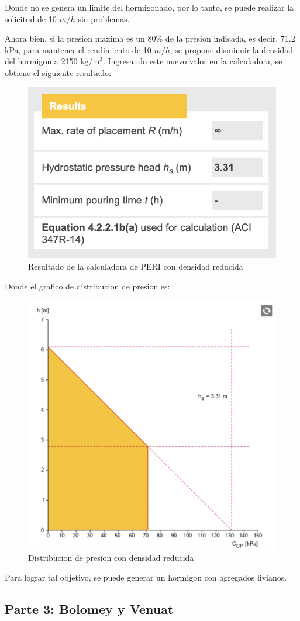 Donde no se genera un limite del hormigonado, por lo tanto, se puede realizar la solicitud de 10 $m/h$ sin problemas.

Ahora bien, si la presion maxima es un 80\% de la presion indicada, es decir, 71.2 kPa, para mantener el rendimiento de 10 $m/h$, se propone disminuir la densidad del hormigon a 2150 kg/m$^3$. Ingresando este nuevo valor en la calculadora, se obtiene el siguiente resultado:

\begin{figure}[H]
    \centering
    \includegraphics[width=0.5\linewidth]{max_rate.png}
    \caption{Resultado de la calculadora de PERI con densidad reducida}
\end{figure}

Donde el grafico de distribucion de presion es:

\begin{figure}[H]
    \centering
    \includegraphics[width=0.5\linewidth]{presiones_2.png}
    \caption{Distribucion de presion con densidad reducida}
\end{figure}

Para lograr tal objetivo, se puede generar un hormigon con agregados livianos.

\subsection*{Parte 3: Bolomey y Venuat}

